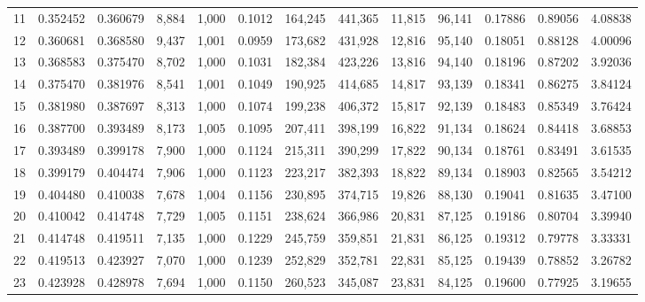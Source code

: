 \begin{tabular}{rrrrrrrrrrrrr}
11  &  0.352452 &  0.360679 &   8,884 &  1,000 &                                     0.1012 &  164,245 &  441,365 &   11,815 &   96,141 &  0.17886 &  0.89056 &  4.08838 \\
12  &  0.360681 &  0.368580 &   9,437 &  1,001 &                                     0.0959 &  173,682 &  431,928 &   12,816 &   95,140 &  0.18051 &  0.88128 &  4.00096 \\
13  &  0.368583 &  0.375470 &   8,702 &  1,000 &                                     0.1031 &  182,384 &  423,226 &   13,816 &   94,140 &  0.18196 &  0.87202 &  3.92036 \\
14  &  0.375470 &  0.381976 &   8,541 &  1,001 &                                     0.1049 &  190,925 &  414,685 &   14,817 &   93,139 &  0.18341 &  0.86275 &  3.84124 \\
15  &  0.381980 &  0.387697 &   8,313 &  1,000 &                                     0.1074 &  199,238 &  406,372 &   15,817 &   92,139 &  0.18483 &  0.85349 &  3.76424 \\
16  &  0.387700 &  0.393489 &   8,173 &  1,005 &                                     0.1095 &  207,411 &  398,199 &   16,822 &   91,134 &  0.18624 &  0.84418 &  3.68853 \\
17  &  0.393489 &  0.399178 &   7,900 &  1,000 &                                     0.1124 &  215,311 &  390,299 &   17,822 &   90,134 &  0.18761 &  0.83491 &  3.61535 \\
18  &  0.399179 &  0.404474 &   7,906 &  1,000 &                                     0.1123 &  223,217 &  382,393 &   18,822 &   89,134 &  0.18903 &  0.82565 &  3.54212 \\
19  &  0.404480 &  0.410038 &   7,678 &  1,004 &                                     0.1156 &  230,895 &  374,715 &   19,826 &   88,130 &  0.19041 &  0.81635 &  3.47100 \\
20  &  0.410042 &  0.414748 &   7,729 &  1,005 &                                     0.1151 &  238,624 &  366,986 &   20,831 &   87,125 &  0.19186 &  0.80704 &  3.39940 \\
21  &  0.414748 &  0.419511 &   7,135 &  1,000 &                                     0.1229 &  245,759 &  359,851 &   21,831 &   86,125 &  0.19312 &  0.79778 &  3.33331 \\
22  &  0.419513 &  0.423927 &   7,070 &  1,000 &                                     0.1239 &  252,829 &  352,781 &   22,831 &   85,125 &  0.19439 &  0.78852 &  3.26782 \\
23  &  0.423928 &  0.428978 &   7,694 &  1,000 &                                     0.1150 &  260,523 &  345,087 &   23,831 &   84,125 &  0.19600 &  0.77925 &  3.19655 \\

\end{tabular}
